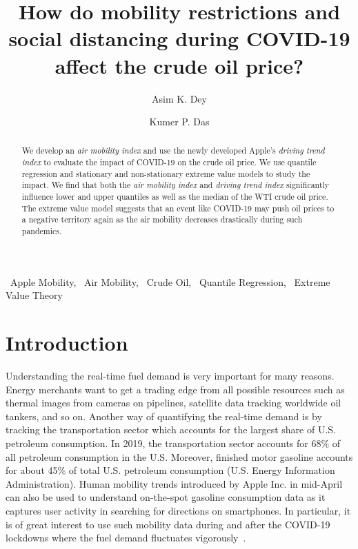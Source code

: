 \documentclass[review]{elsarticle}
\date{}
\begin{document}
\begin{frontmatter}
\title{How do mobility restrictions and social distancing during COVID-19 affect the crude oil price?}


\author[1,2]{Asim K. Dey}
\author[3]{Kumer P. Das}

\address[1]{Princeton University,Princeton, NJ, USA}
\address[2]{The University of Texas at Dallas, Dallas, TX, USA}
\address[3]{University of Louisiana at Lafayette,Lafayette, LA,USA}




\begin{abstract}
We develop an \textit{air mobility index} and use the newly developed Apple's \textit{driving trend index} to evaluate the impact of COVID-19 on the crude oil price. We use quantile regression and stationary and non-stationary extreme value models to study the impact. We find that both the \textit{air mobility index} and \textit{driving trend index} significantly influence lower and upper quantiles as well as the median of the WTI crude oil price. The extreme value model suggests that an event like COVID-19 may push oil prices to a negative territory again as the air mobility decreases drastically during such pandemics.


\end{abstract}



\begin{keyword}
	 \ Apple Mobility, \ Air Mobility,  \ Crude Oil,  \ Quantile Regression, \ Extreme Value Theory 
\end{keyword}


\end{frontmatter}



\section{Introduction}
Understanding the real-time fuel demand is very important for many reasons. Energy merchants want to get a trading edge from all possible resources such as thermal images from cameras on pipelines, satellite data tracking worldwide oil tankers, and so on. Another way of quantifying the real-time demand is by tracking the transportation sector which accounts for the largest share of U.S. petroleum consumption. In 2019, the transportation sector accounts for 68\% of all petroleum consumption in the U.S. Moreover, finished motor gasoline accounts for about 45\% of total U.S. petroleum consumption (U.S. Energy Information Administration). Human mobility trends introduced by Apple Inc. in mid-April can also be used to understand on-the-spot gasoline consumption data as it captures user activity in searching for directions on smartphones. In particular, it is of great interest to use such mobility data during and after the COVID-19 lockdowns where the fuel demand fluctuates vigorously~\citep{Bildirici2020AnalyzingCO,Jefferson2020ACF,Shiqi2020}. 
\end{document}
